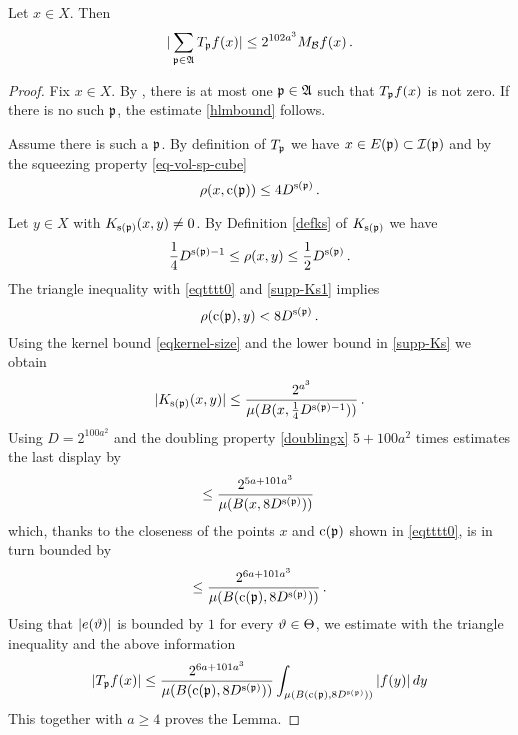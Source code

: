 \begin{lemma}
    \label{maximal-bound-antichain}
    \leanok
    Let $x\in X$.
    Then
    \begin{equation}\label{hlmbound}
    | \sum_{{\mathfrak p} \in \mathfrak{A}}T_{{\mathfrak p}} f(x)|\le 2^{102 a^3} M_{\mathcal{B}} f (x) \, .
    \end{equation}
\end{lemma}

\begin{proof}
\leanok
Fix $x\in X$. By , there is at most one ${\mathfrak p} \in \mathfrak{A}$
such that
 $T_{{\mathfrak p}} f(x)$ is not zero.
 If there is no such ${\mathfrak p}$, the estimate \eqref{hlmbound} follows.

 Assume there is such a ${\mathfrak p}$.
 By definition of $T_{{\mathfrak p}}$ we have $x\in E({\mathfrak p})\subset {\mathcal{I}}({\mathfrak p})$ and by the squeezing property \eqref{eq-vol-sp-cube}
\begin{equation}\label{eqtttt0}
    \rho(x, {\mathrm{c}}({\mathfrak p}))\le 4D^{{\mathrm{s}}({\mathfrak p})}\, .
\end{equation}

Let $y\in X$ with $K_{{\mathrm{s}}({\mathfrak p})}(x,y)\neq 0$. By Definition \eqref{defks} of $K_{{\mathrm{s}}({\mathfrak p})}$
we have
\begin{equation}\label{supp-Ks1}
   \frac{1}{4} D^{{\mathrm{s}}({\mathfrak p})-1}
   \leq \rho(x,y) \leq \frac{1}{2} D^{{\mathrm{s}}({\mathfrak p})}\, .
\end{equation}
The triangle inequality with \eqref{eqtttt0} and \eqref{supp-Ks1} implies
\begin{equation}
    \rho({\mathrm{c}}({\mathfrak p}),y) < 8D^{{\mathrm{s}}({\mathfrak p})}\, .
\end{equation}
Using the kernel bound \eqref{eqkernel-size} and the lower bound in \eqref{supp-Ks}
we obtain
\begin{equation}
|K_{{\mathrm{s}}({\mathfrak p})}(x,y)|\le \frac{2^{a^3}}{\mu(B(x,\frac 14 D^{{{\mathrm{s}}({\mathfrak p})}-1}))}\, .
\end{equation}
Using $D=2^{100a^2}$
and the doubling property \eqref{doublingx} $5 +100a^2$ times estimates
the last display by
\begin{equation}
\le \frac{2^{5a+101a^3}}{\mu(B(x, 8D^{{\mathrm{s}}({\mathfrak p})}))}\,
\end{equation}
which, thanks to the closeness of the points $x$ and ${\mathrm{c}}({\mathfrak p})$ shown in \eqref{eqtttt0}, is in turn bounded by
\begin{equation}
\le \frac{2^{6a+101a^3}}{\mu(B({\mathrm{c}}({\mathfrak p}), 8D^{{\mathrm{s}}({\mathfrak p})}))}\, .
\end{equation}
 Using that {$|e({\vartheta})|$} is bounded by $1$
for every ${\vartheta}\in {\Theta}$, we estimate with the triangle inequality and the above information
 \begin{equation}
  | T_{{\mathfrak p}} f(x)|
    \le \frac{2^{6a+101 a^3}}{\mu(B({\mathrm{c}}({\mathfrak p}), 8D^{{\mathrm{s}}({\mathfrak p})}))} \int _{\mu(B({\mathrm{c}}({\mathfrak p}), 8D^{{\mathrm{s}}({\mathfrak p})}))} |f(y)|\, dy
  \end{equation}
This together with $a\ge 4$ proves the Lemma.
\end{proof}

